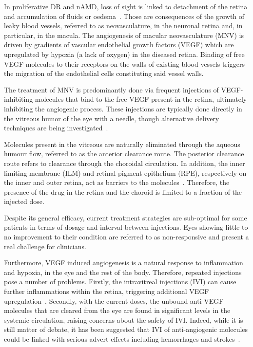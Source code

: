 \documentclass[12pt,a4paper]{journal}
\begin{document}
In proliferative DR and nAMD, loss of sight is linked to detachment of the retina and accumulation of fluids or oedema~\cite{Roberts_2020, Waldstein_2016}.
Those are consequences of the growth of leaky blood vessels, referred to as neovasculature, in the neuronal retina and, in particular, in the macula.
The angiogenesis of macular neovasculature (MNV) is driven by gradients of vascular endothelial growth factors (VEGF) which are upregulated by hypoxia (a lack of oxygen) in the diseased retina.
Binding of free VEGF molecules to their receptors on the walls of existing blood vessels triggers the migration of the endothelial cells constituting said vessel walls.

The treatment of MNV is predominantly done via frequent injections of VEGF-inhibiting molecules that bind to the free VEGF present in the retina, ultimately inhibiting the angiogenic process.
These injections are typically done directly in the vitreous humor of the eye with a needle, though alternative delivery techniques are being investigated~\cite{Kim_2021}.

Molecules present in the vitreous are naturally eliminated through the aqueous humour flow, referred to as the anterior clearance route.
The posterior clearance route refers to clearance through the choroidal circulation.
In addition, the inner limiting membrane (ILM) and retinal pigment epithelium (RPE), respectively on the inner and outer retina, act as barriers to the molecules~\cite{Park_2015}.
Therefore, the presence of the drug in the retina and the choroid is limited to a fraction of the injected dose. 

Despite its general efficacy, current treatment strategies are sub-optimal for some patients in terms of dosage and interval between injections.
Eyes showing little to no improvement to their condition are referred to as non-responsive and present a real challenge for clinicians.

Furthermore, VEGF induced angiogenesis is a natural response to inflammation and hypoxia, in the eye and the rest of the body. 
Therefore, repeated injections pose a number of problems.
Firstly, the intravitreal injections (IVI) can cause further inflammations within the retina, triggering additional VEGF upregulation~\cite{Iyer_2022}.
Secondly, with the current doses, the unbound anti-VEGF molecules that are cleared from the eye are found in significant levels in the systemic circulation, raising concerns about the safety of IVI.
Indeed, while it is still matter of debate, it has been suggested that IVI of anti-angiogenic molecules could be linked with serious advert effects including hemorrhages and strokes~\cite{Avery_2016, Kaiser_2019, Maloney_2021}.
\end{document}
